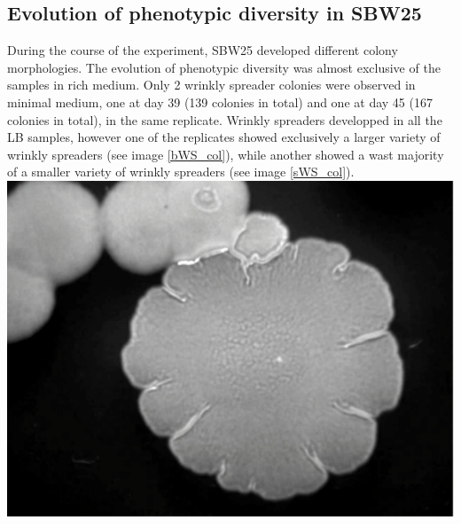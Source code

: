 \documentclass[
    11pt,
    a4paper,
    twoside
]{article} %
\begin{document}
\begin{multicols}{2}
\subsection*{Evolution of phenotypic diversity in SBW25}
During the course of the experiment, SBW25 developed different colony morphologies.
The evolution of phenotypic diversity was almost exclusive of the samples in rich medium.
Only 2 wrinkly spreader colonies were observed in minimal medium, one at day 39 (139 colonies in total) and one at day 45 (167 colonies in total), in the same replicate.
Wrinkly spreaders developped in all the LB samples, however one of the replicates showed exclusively a larger variety of wrinkly spreaders (see image \ref{bWS_col}), while another showed a wast majority of a smaller variety of wrinkly spreaders (see image \ref{sWS_col}).
\\[2ex]
\includegraphics[width=\columnwidth]{bWS_col.pdf}
\label{bWS_col}
\vspace{2ex}


\end{multicols}
\end{document}
